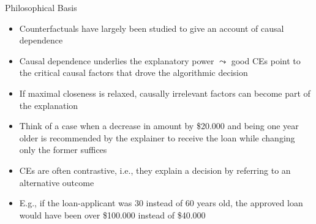 \documentclass[11pt,compress,t,notes=noshow, aspectratio=169, xcolor=table]{beamer}
\begin{document}
\begin{frame}{Philosophical Basis}
	\begin{itemize}
	\item Counterfactuals have largely been studied to give an account of causal dependence
		\item Causal dependence underlies the explanatory power $\leadsto$ good CEs point to the critical causal factors that drove the algorithmic decision
		\item If maximal closeness is relaxed, causally irrelevant factors can become part of the explanation
		\item Think of a case when a decrease in amount by \$20.000 and being one year older is recommended by the explainer to receive the loan while changing only the former suffices
		\item CEs are often contrastive, i.e., they explain a decision by referring to an alternative outcome
		\item E.g., if the loan-applicant was 30 instead of 60 years old, the approved loan would have been over \$100.000 instead of \$40.000%
	\end{itemize}
\end{frame}

\end{document}
